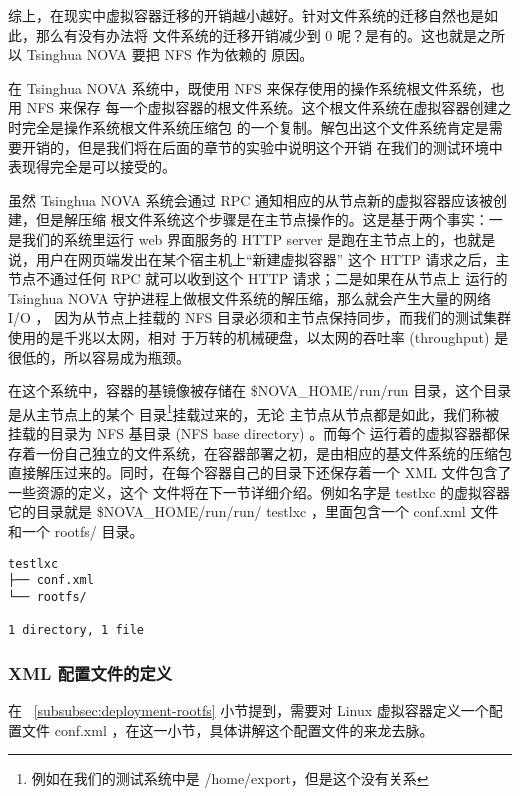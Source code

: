 综上，在现实中虚拟容器迁移的开销越小越好。针对文件系统的迁移自然也是如此，那么有没有办法将
文件系统的迁移开销减少到 0 呢？是有的。这也就是之所以 Tsinghua NOVA 要把 NFS 作为依赖的
原因。

在 Tsinghua NOVA 系统中，既使用 NFS 来保存使用的操作系统根文件系统，也用 NFS 来保存
每一个虚拟容器的根文件系统。这个根文件系统在虚拟容器创建之时完全是操作系统根文件系统压缩包
的一个复制。解包出这个文件系统肯定是需要开销的，但是我们将在后面的章节的实验中说明这个开销
在我们的测试环境中表现得完全是可以接受的。


虽然 Tsinghua NOVA 系统会通过 RPC 通知相应的从节点新的虚拟容器应该被创建，但是解压缩
根文件系统这个步骤是在主节点操作的。这是基于两个事实：一是我们的系统里运行 web 界面服务的
HTTP server 是跑在主节点上的，也就是说，用户在网页端发出在某个宿主机上“新建虚拟容器”
这个 HTTP 请求之后，主节点不通过任何 RPC 就可以收到这个 HTTP 请求；二是如果在从节点上
运行的 Tsinghua NOVA 守护进程上做根文件系统的解压缩，那么就会产生大量的网络 I/O ，
因为从节点上挂载的 NFS 目录必须和主节点保持同步，而我们的测试集群使用的是千兆以太网，相对
于万转的机械硬盘，以太网的吞吐率 (throughput) 是很低的，所以容易成为瓶颈。


在这个系统中，容器的基镜像被存储在 \$NOVA_HOME/run/run 目录，这个目录是从主节点上的某个
目录\footnote{例如在我们的测试系统中是 /home/export，但是这个没有关系}挂载过来的，无论
主节点从节点都是如此，我们称被挂载的目录为 NFS 基目录 (NFS base directory) 。而每个
运行着的虚拟容器都保存着一份自己独立的文件系统，在容器部署之初，是由相应的基文件系统的压缩包
直接解压过来的。同时，在每个容器自己的目录下还保存着一个 XML 文件包含了一些资源的定义，这个
文件将在下一节详细介绍。例如名字是 testlxc 的虚拟容器它的目录就是 \$NOVA_HOME/run/run/
testlxc ，里面包含一个 conf.xml 文件和一个 rootfs/ 目录。

\begin{lstlisting}
testlxc
├── conf.xml
└── rootfs/

1 directory, 1 file
\end{lstlisting}

\subsubsection{XML 配置文件的定义}
\label{subsubsec:xml-definition}

在 ~\ref{subsubsec:deployment-rootfs} 小节提到，需要对 Linux 虚拟容器定义一个配置文件
conf.xml ，在这一小节，具体讲解这个配置文件的来龙去脉。

